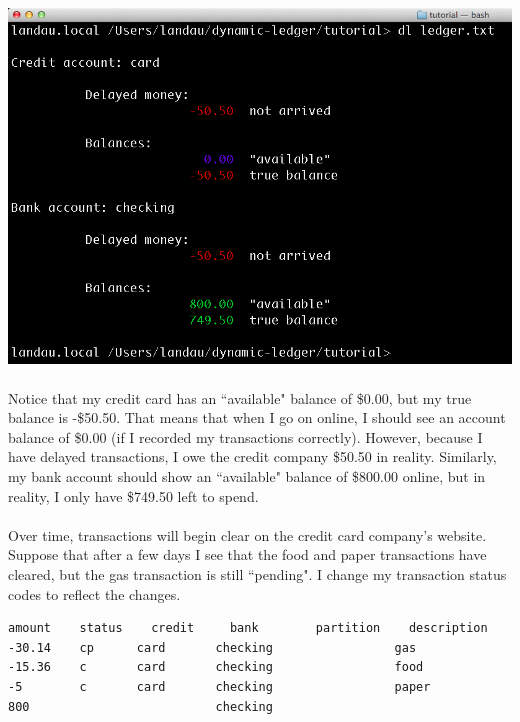 \documentclass{article}
\begin{document}
\begin{flushleft}
\begin{center}
\includegraphics[scale=.45]{fig/sum3.png}
\end{center} 

\paragraph{} Notice that my credit card has an ``available" balance of \$0.00, but my true balance is -\$50.50. That means that when I go on online, I should see an account balance of  \$0.00 (if I recorded my transactions correctly). However, because I have delayed transactions, I owe the credit company \$50.50 in reality. Similarly, my bank account should show an ``available" balance of \$800.00 online, but in reality, I only have \$749.50 left to spend. 

\paragraph{} Over time, transactions will begin clear on the credit card company's website. Suppose that after a few days I see that the food and paper transactions have cleared, but the gas transaction is still ``pending". I change my transaction status codes to reflect the changes.

\begin{lstlisting}[title=ledger.txt]
amount    status	credit     bank        partition    description
-30.14    cp      card       checking                 gas
-15.36    c       card       checking                 food
-5        c       card       checking                 paper
800                          checking
\end{lstlisting}


\end{flushleft}
\end{document}

